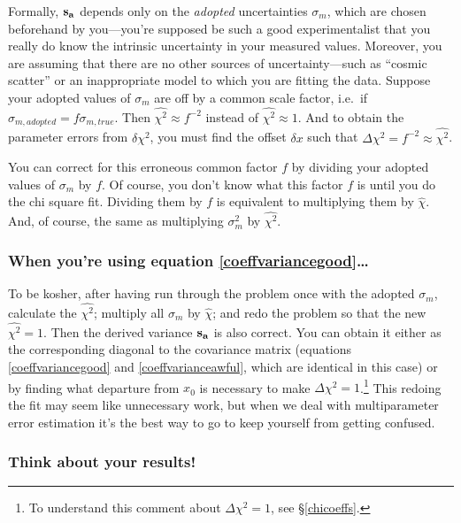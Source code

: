 \documentclass[psfig,preprint]{aastex}
\begin{document}
        Formally, ${\bf s_a}$ depends only on the {\it adopted}
uncertainties $\sigma_{m}$, which are chosen beforehand by
you---you're supposed be such a good experimentalist that you really do
know the intrinsic uncertainty in your measured values.  Moreover, you
are assuming that there are no other sources of uncertainty---such as
``cosmic scatter'' or an inappropriate model to which you are fitting
the data.  Suppose your adopted values of $\sigma_{m}$ are off by a
common scale factor, i.e.\ if $\sigma_{m,adopted} =
f\sigma_{m,true}$.  Then $\widehat{\chi^2} \approx f^{-2}$ instead of
$\widehat{\chi^2} \approx 1$.  And to obtain the parameter errors from
$\delta \chi^2$, you must find the offset $\delta x$ such that $\Delta
\chi^2 = f^{-2} \approx \widehat{\chi^2}$. 

	You can correct for this erroneous common factor $f$ by dividing
your adopted values of $\sigma_{m}$ by $f$.  Of course, you don't
know what this factor $f$ is until you do the chi square fit.  Dividing
them by $f$ is equivalent to multiplying them by $\widehat{\chi}$.  And,
of course, the same as multiplying $\sigma_{m}^2$ by
$\widehat{\chi^2}$. 

\subsubsection{When you're using equation \ref{coeffvariancegood}\dots}
\label{diatrabetwo}

	To be kosher, after having run through the problem once with the
adopted $\sigma_{m}$, calculate the $\widehat{\chi^2}$; multiply all
$\sigma_{m}$ by $\widehat{\chi}$; and redo the problem so that the new
$\widehat{\chi^2} = 1$.  Then the derived variance ${\bf s_a}$ is also
correct.  You can obtain it either as the corresponding diagonal to the
covariance matrix (equations \ref{coeffvariancegood} and
\ref{coeffvarianceawful}, which are identical in this case) or by
finding what departure from $x_0$ is necessary to make $\Delta \chi^2 =
1$.\footnote{To understand this comment about $\Delta \chi^2 = 1$, see
\S \ref {chicoeffs}.} This redoing the fit may seem like unnecessary
work, but when we deal with multiparameter error estimation it's the
best way to go to keep yourself from getting confused. 

\subsubsection{Think about your results!}
\end{document}
